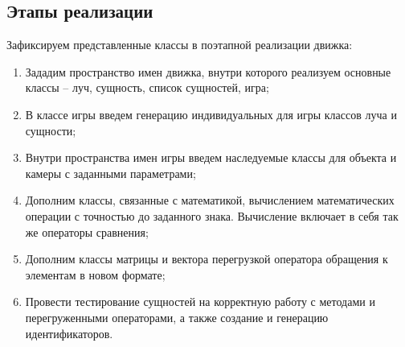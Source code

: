 \subsection{Этапы реализации}

	Зафиксируем представленные классы в поэтапной реализации движка:
	\begin{enumerate}
		\item Зададим пространство имен движка, внутри которого реализуем основные классы -- луч, сущность, список сущностей, игра;
		\item В классе игры введем генерацию индивидуальных для игры классов луча и сущности;
		\item Внутри пространства имен игры введем наследуемые классы для объекта и камеры с заданными параметрами;
		\item Дополним классы, связанные с математикой, вычислением математических операции с точностью до заданного знака. Вычисление включает в себя так же операторы сравнения;
		\item Дополним классы матрицы и вектора перегрузкой оператора обращения к элементам в новом формате;
		\item Провести тестирование сущностей на корректную работу с методами и перегруженными операторами, а также создание и генерацию идентификаторов.
	\end{enumerate}
